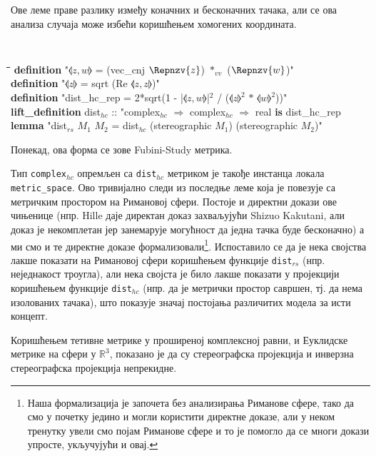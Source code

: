 Ове леме праве разлику између коначних и бесконачних тачака, али се
ова анализа случаја може избећи коришћењем хомогених координата.

{\tt
\begin{tabbing}
\hspace{5mm}\=\hspace{5mm}\=\hspace{5mm}\=\hspace{5mm}\=\hspace{5mm}\=\kill
{\bf definition} "$\llangle z, w \rrangle$ = (vec\_cnj $\Repnzv{z}$) $*_{vv}$ ($\Repnzv{w}$)"\\
{\bf definition} "$\llangle z \rrangle$ = sqrt (Re $\llangle z, z\rrangle$)"\\
{\bf definition} "dist\_hc\_rep = 2*sqrt(1 - |$\llangle z,w \rrangle$|$^2$ / ($\llangle z \rrangle^2$ $*$ $\llangle w \rrangle^2$))"\\
{\bf lift\_definition} dist$_{hc}$ :: "complex$_{hc}$ $\Rightarrow$ complex$_{hc}$ $\Rightarrow$ real {\bf is} dist\_hc\_rep\\
{\bf lemma} "dist$_{rs}$ $M_1$ $M_2$ = dist$_{hc}$ (stereographic $M_1$) (stereographic $M_2$)"
\end{tabbing}
}
\noindent Понекад, ова форма се зове Fubini-Study метрика.

Тип {\tt complex$_{hc}$} опремљен са {\tt dist$_{hc}$} метриком је
такође инстанца локала {\tt metric\_space}.  Ово тривијално следи из
последње леме која је повезује са метричким простором на Римановој
сфери. Постоје и директни докази ове чињенице (нпр. Hille \cite{hille}
даје директан доказ захваљујући Shizuo Kakutani, али доказ је
некомплетан јер занемарује могућност да једна тачка буде бесконачно) а
ми смо и те директне доказе формализовали\footnote{Наша формализација
  је започета без анализирања Риманове сфере, тако да смо у почетку
  једино и могли користити директне доказе, али у неком тренутку увели
  смо појам Риманове сфере и то је помогло да се многи докази упросте,
  укључујући и овај.}. Испоставило се да је нека својства лакше
показати на Римановој сфери коришћењем функције {\tt dist$_{rs}$}
(нпр. неједнакост троугла), али нека својста је било лакше показати у
пројекцији коришћењем функције {\tt dist$_{hc}$} (нпр. да је метрички
простор савршен, тј. да нема изолованих тачака), што показује значај
постојања различитих модела за исти концепт.

Коришћењем тетивне метрике у проширеној комплексној равни, и Еуклидске
метрике на сфери у $\mathbb{R}^3$, показано је да су стереографска
пројекција и инверзна стереографска пројекција непрекидне.


